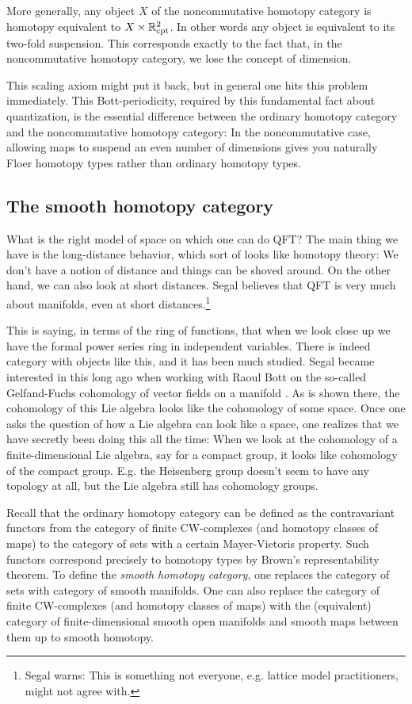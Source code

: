 More generally, any object $X$ of the noncommutative homotopy category is 
homotopy equivalent to $X\times \mathbb{R}^2_{\mathrm{cpt}}$.
In other words any object is equivalent to its two-fold suspension.
This corresponds exactly to the fact that, in the noncommutative homotopy category,
we lose the concept of dimension.

This scaling axiom might put it back, but in general one hits this problem immediately. 
This Bott-periodicity, required by this fundamental fact about quantization, 
is the essential difference between the ordinary homotopy category and the noncommutative
homotopy category:
In the noncommutative case, allowing maps to suspend an even number of dimensions gives
you naturally Floer homotopy types rather than ordinary homotopy types.

\subsection{The smooth homotopy category}

What is the right model of space on which one can do QFT?
The main thing we have is the long-distance behavior, which sort of looks like homotopy
theory: We don't have a notion of distance and things can be shoved around.
On the other hand, we can also look at short distances.
Segal believes that QFT is very much about manifolds, even at short
distances.\footnote{Segal warns: This is something not everyone, e.g. lattice model
practitioners, might not agree with.}

This is saying, in terms of the ring of
functions, that when we look close up we have the formal power series ring in independent
variables. There is indeed category with objects like this, and it has been much studied.
Segal became interested in this long ago when working with Raoul Bott on the so-called
Gelfand-Fuchs cohomology of vector fields on a manifold \cite{BS77}. 
As is shown there, the cohomology of this Lie algebra looks like the cohomology of some
space. 
Once one asks the question of how a Lie algebra can look like a space, one realizes that
we have secretly been doing this all the time:
When we look at the cohomology of a finite-dimensional Lie algebra, say for a compact group, 
it looks like cohomology of the compact group.
E.g. the Heisenberg group doesn't seem to have any topology at all, but the Lie algebra
still has cohomology groups.

Recall that the ordinary homotopy category can be defined as the contravariant functors
from the category of finite CW-complexes (and homotopy classes of maps)
to the category of sets with a certain Mayer-Vietoris property.
Such functors correspond precisely to homotopy types by Brown's representability theorem.
To define the \emph{smooth homotopy category}, one replaces the category of sets with
category of smooth manifolds. 
One can also replace the category of finite CW-complexes (and homotopy classes of maps)
with the (equivalent) category of finite-dimensional smooth open manifolds and smooth maps
between them up to smooth homotopy.

